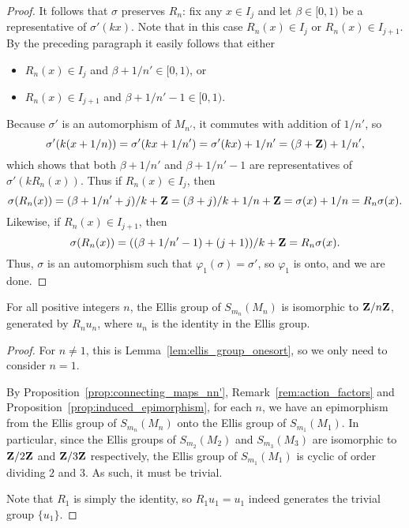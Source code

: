 \begin{proof}
		It follows that $\sigma$ preserves $R_n$: fix any $x\in I_j$ and let $\beta\in [0,1)$ be a representative of $\sigma'(kx)$. Note that in this case $R_n(x)\in I_j$ or $R_n(x)\in I_{j+1}$. By the preceding paragraph it easily follows that either
		\begin{itemize}
			\item
			 $R_n(x)\in I_j$ and $\beta+1/n'\in [0,1)$, or
			\item
			$R_n(x)\in I_{j+1}$ and $\beta+1/n'-1\in [0,1)$.
		\end{itemize}
		Because $\sigma'$ is an automorphism of $M_{n'}$, it commutes with addition of $1/n'$, so
		\[
			\sigma'(k(x+1/n))=\sigma'(kx+1/n')=\sigma'(kx)+1/n'=(\beta+{\mathbf{Z}})+1/n',
		\]
		which shows that both $\beta+1/n'$ and $\beta+1/n'-1$ are representatives of $\sigma'(kR_n(x))$. Thus if $R_n(x)\in I_j$, then
		\[
			\sigma(R_n(x))=(\beta+1/n'+j)/k+{\mathbf{Z}}=(\beta+j)/k+1/n+{\mathbf{Z}}=\sigma(x)+1/n=R_n\sigma(x).
		\]
		Likewise, if $R_n(x)\in I_{j+1}$, then
		\[
			\sigma(R_n(x))=((\beta+1/n'-1)+(j+1))/k+{\mathbf{Z}}=R_n\sigma(x).
		\]
		Thus, $\sigma$ is an automorphism such that $\varphi_1(\sigma)=\sigma'$, so $\varphi_1$ is onto, and we are done.
	\end{proof}


	\begin{cor}
		\label{cor:ellis_groups_allsorts}
		For all positive integers $n$, the Ellis group of $S_{m_n}(M_n)$ is isomorphic to ${\mathbf{Z}}/n{\mathbf{Z}}$, generated by $R_nu_n$, where $u_n$ is the identity in the Ellis group.
	\end{cor}
	\begin{proof}
		For $n\neq 1$, this is Lemma~\ref{lem:ellis_group_onesort}, so we only need to consider $n=1$.
		
		By Proposition~\ref{prop:connecting_maps_nn'}, Remark~\ref{rem:action_factors} and Proposition~\ref{prop:induced_epimorphism}, for each $n$, we have an epimorphism from the Ellis group of $S_{m_n}(M_n)$ onto the Ellis group of $S_{m_1}(M_1)$. In particular, since the Ellis groups of $S_{m_2}(M_2)$ and $S_{m_3}(M_3)$ are isomorphic to ${\mathbf{Z}}/2{\mathbf{Z}}$ and ${\mathbf{Z}}/3{\mathbf{Z}}$ respectively, the Ellis group of $S_{m_1}(M_1)$ is cyclic of order dividing $2$ and $3$. As such, it must be trivial.
		
		Note that $R_1$ is simply the identity, so $R_1u_1=u_1$ indeed generates the trivial group $\{u_1\}$.
	\end{proof}
	
